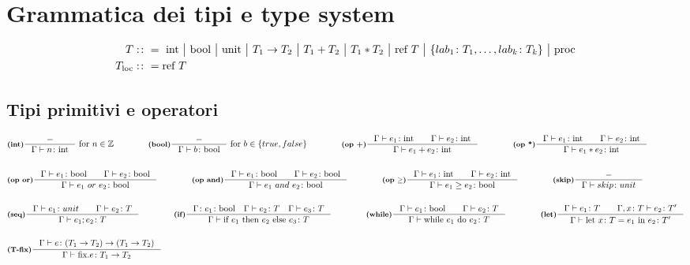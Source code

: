 \documentclass[a4paper, 10pt]{article}
\newcommand{\numberset}{\mathbb}
\newcommand{\Z}{\numberset{Z}}
\newcommand{\integer}{\textup{int}}
\newcommand{\bool}{\textup{bool}}
\theoremstyle{definition}
\newcommand{\infer}[4]{\inference[\textbf{#1}]{#2}{#3}#4 }
\begin{document}
\section*{Grammatica dei tipi e type system}
\vspace{-.5cm}
\begin{minipage}{.45\linewidth}
	\begin{flushleft}
	\begin{align*}
		T&:\colon=\ \integer\ \big|\ \bool\ \big|\ \textup{unit}\ \big|\ T_1\rightarrow T_2\ \big|\ T_1 + T_2\ \big|\ T_1 * T_2\ 
		\big|\ \textup{ref}\ T\ \big|\ \{lab_1\colon T_1, \dots, lab_k\colon T_k \}\ \big|\ \text{proc} \\
		T_{\text{loc}}&:\colon = \text{ref } T
	\end{align*}	
	\vspace{-1cm}
\subsection*{Tipi primitivi e operatori}
	\begin{align*}
		&\infer{(int)}{-}{\Gamma \vdash n\colon \integer}{\ \textup{for}\ n \in \Z} \qquad\qquad
		\infer{(bool)}{-}{\Gamma \vdash b\colon \bool}{\ \textup{for}\ b \in \{true, false\}} \qquad\qquad
		\infer{(op +)}{\Gamma \vdash e_1\colon \integer\qquad \Gamma \vdash e_2\colon \integer}{\Gamma\vdash e_1 + e_2 \colon \integer}{}\qquad\qquad
		\infer{(op *)}{\Gamma \vdash e_1\colon \integer\qquad \Gamma \vdash e_2\colon \integer}{\Gamma\vdash e_1 * e_2 \colon \integer}{} \\ \\
		&\infer{(op or)}{\Gamma\vdash e_1\colon \bool\qquad \Gamma\vdash e_2\colon\bool}{\Gamma\vdash e_1\ or\ e_2 \colon\bool}{}\qquad\qquad
		\infer{(op and)}{\Gamma\vdash e_1\colon \bool\qquad \Gamma\vdash e_2\colon\bool}{\Gamma\vdash e_1\ and\ e_2 \colon\bool}{} \qquad\qquad
		\infer{(op $ \geq $)}{\Gamma \vdash e_1\colon \integer\qquad \Gamma \vdash e_2\colon \integer}{\Gamma\vdash e_1 \geq e_2 \colon \bool}{}\qquad\qquad
		\infer{(skip)}{-}{\Gamma\vdash skip\colon unit}{}\\ \\
		&\infer{(seq)}{\Gamma \vdash e_1\colon unit \qquad \Gamma\vdash e_2\colon T}{\Gamma \vdash e_1;e_2\colon T}{}\qquad\qquad
		\infer{(if)}{\Gamma\colon e_1\colon\bool\quad\Gamma\vdash e_2\colon T\quad \Gamma\vdash e_3 \colon T}{\Gamma\vdash \textup{if}\ e_1\ \textup{then}\ e_2\ \textup{else}\ e_3\colon T }{} \qquad\qquad
		\infer{(while)}{\Gamma\vdash e_1 \colon \bool\qquad \Gamma\vdash e_2 \colon T}{\Gamma \vdash\textup{while}\ e_1\ \textup{do}\ e_2\colon T}{}\qquad\qquad
		\infer{(let)}{\Gamma \vdash e_1\colon T\qquad \Gamma,x\colon T \vdash e_2\colon T'}{
			\Gamma\vdash \textup{let}\ x\colon T = e_1\ \textup{in}\ e_2\colon T'}{} \\ \\
		&\infer{(T-fix)}{\Gamma\vdash e\colon (T_1\rightarrow T_2)\rightarrow(T_1\rightarrow T_2)}{\Gamma\vdash \text{fix}.e\colon T_1\rightarrow T_2}{}
	\end{align*}

\end{flushleft}
\end{minipage}
\end{document}
